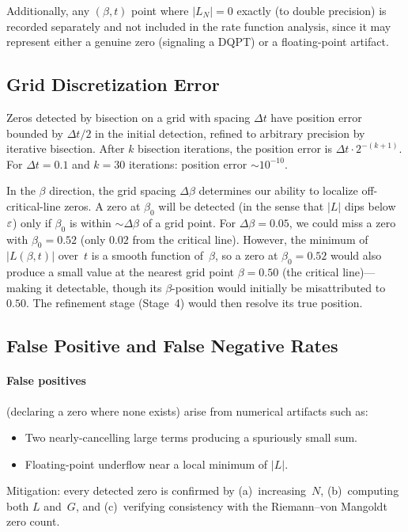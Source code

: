 Additionally, any $(\beta, t)$ point where $|L_N| = 0$ exactly (to double precision) is
recorded separately and not included in the rate function analysis, since it may
represent either a genuine zero (signaling a DQPT) or a floating-point artifact.


\subsection{Grid Discretization Error}
\label{sec:grid-error}

Zeros detected by bisection on a grid with spacing $\Delta t$ have position error bounded
by $\Delta t/2$ in the initial detection, refined to arbitrary precision by iterative
bisection. After $k$ bisection iterations, the position error is
$\Delta t \cdot 2^{-(k+1)}$. For $\Delta t = 0.1$ and $k = 30$ iterations: position
error $\sim 10^{-10}$.

In the $\beta$ direction, the grid spacing $\Delta\beta$ determines our ability to
localize off-critical-line zeros. A zero at $\beta_0$ will be detected (in the sense
that $|L|$ dips below~$\varepsilon$) only if $\beta_0$ is within $\sim\!\Delta\beta$ of a grid
point. For $\Delta\beta = 0.05$, we could miss a zero with $\beta_0 = 0.52$ (only $0.02$
from the critical line). However, the minimum of $|L(\beta, t)|$ over~$t$ is a smooth
function of~$\beta$, so a zero at $\beta_0 = 0.52$ would also produce a small value at
the nearest grid point $\beta = 0.50$ (the critical line)---making it detectable, though
its $\beta$-position would initially be misattributed to~$0.50$. The refinement stage
(Stage~4) would then resolve its true position.


\subsection{False Positive and False Negative Rates}
\label{sec:false-rates}

\paragraph{False positives} (declaring a zero where none exists) arise from numerical
artifacts such as:
\begin{itemize}
  \item Two nearly-cancelling large terms producing a spuriously small sum.
  \item Floating-point underflow near a local minimum of $|L|$.
\end{itemize}
Mitigation: every detected zero is confirmed by (a)~increasing~$N$, (b)~computing both
$L$ and~$G$, and (c)~verifying consistency with the Riemann--von Mangoldt zero count.

